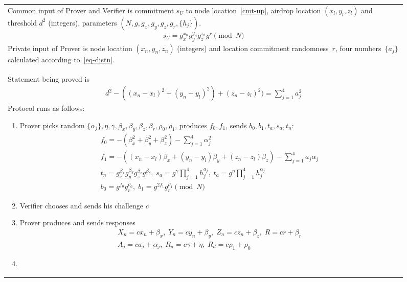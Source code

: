 \documentclass{article}
\begin{document}
\begin{figure}[!htb]
\begin{tabular}{|p{\linewidth}|}
\hline

Common input of Prover and Verifier is
  commitment $s_U$ to node location~\eqref{cmt-up},
  airdrop location $(x_l, y_l, z_l)$ and
  threshold $d^2$ (integers),
  parameters $(N, g, g_x, g_y, g_z, g_r, \{h_j\})$.
\begin{gather}
\label{cmt-up}
  s_U = g_x^{x_n} g_y^{y_n} g_z^{z_n} g^{r} \pmod{N}
\end{gather}
Private input of Prover is
  node location $(x_n, y_n, z_n)$ (integers) and location commitment randomness~$r$,
  four numbers~$\{a_j\}$ calculated
  according to~\eqref{eq-distn}.
\\
Statement being proved is
\begin{gather}
\label{eq-distn}
  d^2 - ((x_n - x_l)^2 + (y_n - y_l)^2) + (z_n - z_l)^2) = \sum_{j=1}^4 a_j^2
\end{gather}
Protocol runs as follows:
\begin{enumerate}
\item
  Prover picks random $\{\alpha_j\}, \eta, \gamma, \beta_x, \beta_y, \beta_z, \beta_r, \rho_0, \rho_1$,
  produces $f_0, f_1$, sends $b_0, b_1, t_a, s_a, t_n$:
\begin{gather}
  f_0 = -(\beta_x^2 + \beta_y^2 + \beta_z^2) - \sum_{j=1}^4 \alpha_j^2   \\
  f_1 = -( (x_n - x_l) \beta_x  + (y_n - y_l) \beta_y  + (z_n - z_l) \beta_z) - \sum_{j=1}^4 a_j \alpha_j   \\
%
  t_n = g_x^{\beta_x} g_y^{\beta_y} g_z^{\beta_z} g^{\beta_r} ,   \;
  s_a = g^{\gamma} \prod_{j=1}^4 h_j^{a_j},   \;
  t_a = g^{\eta} \prod_{j=1}^4 h_j^{\alpha_j} \\
  b_0 = g^{f_0} g_r^{\rho_0},  \;
  b_1 = g^{2 f_1} g_r^{\rho_1} \pmod{N}
\end{gather}
%
\item
  Verifier chooses and sends his challenge $c$
\item
  Prover produces and sends responses
\begin{gather}
  X_n = c x_n + \beta_x,  \;
  Y_n = c y_n + \beta_y,  \;
  Z_n = c z_n + \beta_z,  \;
  R = c r + \beta_r   \\
  A_j = c a_j + \alpha_j, \;
  R_a = c \gamma + \eta,   \;
  R_d = c \rho_1 + \rho_0
\end{gather}
%
\item

\end{enumerate}
\end{tabular}
\end{figure}
\end{document}
